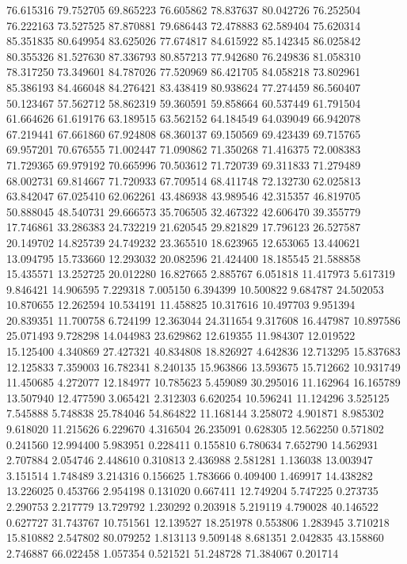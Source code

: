 76.615316
79.752705
69.865223
76.605862
78.837637
80.042726
76.252504
76.222163
73.527525
87.870881
79.686443
72.478883
62.589404
75.620314
85.351835
80.649954
83.625026
77.674817
84.615922
85.142345
86.025842
80.355326
81.527630
87.336793
80.857213
77.942680
76.249836
81.058310
78.317250
73.349601
84.787026
77.520969
86.421705
84.058218
73.802961
85.386193
84.466048
84.276421
83.438419
80.938624
77.274459
86.560407
50.123467
57.562712
58.862319
59.360591
59.858664
60.537449
61.791504
61.664626
61.619176
63.189515
63.562152
64.184549
64.039049
66.942078
67.219441
67.661860
67.924808
68.360137
69.150569
69.423439
69.715765
69.957201
70.676555
71.002447
71.090862
71.350268
71.416375
72.008383
71.729365
69.979192
70.665996
70.503612
71.720739
69.311833
71.279489
68.002731
69.814667
71.720933
67.709514
68.411748
72.132730
62.025813
63.842047
67.025410
62.062261
43.486938
43.989546
42.315357
46.819705
50.888045
48.540731
29.666573
35.706505
32.467322
42.606470
39.355779
17.746861
33.286383
24.732219
21.620545
29.821829
17.796123
26.527587
20.149702
14.825739
24.749232
23.365510
18.623965
12.653065
13.440621
13.094795
15.733660
12.293032
20.082596
21.424400
18.185545
21.588858
15.435571
13.252725
20.012280
16.827665
2.885767
6.051818
11.417973
5.617319
9.846421
14.906595
7.229318
7.005150
6.394399
10.500822
9.684787
24.502053
10.870655
12.262594
10.534191
11.458825
10.317616
10.497703
9.951394
20.839351
11.700758
6.724199
12.363044
24.311654
9.317608
16.447987
10.897586
25.071493
9.728298
14.044983
23.629862
12.619355
11.984307
12.019522
15.125400
4.340869
27.427321
40.834808
18.826927
4.642836
12.713295
15.837683
12.125833
7.359003
16.782341
8.240135
15.963866
13.593675
15.712662
10.931749
11.450685
4.272077
12.184977
10.785623
5.459089
30.295016
11.162964
16.165789
13.507940
12.477590
3.065421
2.312303
6.620254
10.596241
11.124296
3.525125
7.545888
5.748838
25.784046
54.864822
11.168144
3.258072
4.901871
8.985302
9.618020
11.215626
6.229670
4.316504
26.235091
0.628305
12.562250
0.571802
0.241560
12.994400
5.983951
0.228411
0.155810
6.780634
7.652790
14.562931
2.707884
2.054746
2.448610
0.310813
2.436988
2.581281
1.136038
13.003947
3.151514
1.748489
3.214316
0.156625
1.783666
0.409400
1.469917
14.438282
13.226025
0.453766
2.954198
0.131020
0.667411
12.749204
5.747225
0.273735
2.290753
2.217779
13.729792
1.230292
0.203918
5.219119
4.790028
40.146522
0.627727
31.743767
10.751561
12.139527
18.251978
0.553806
1.283945
3.710218
15.810882
2.547802
80.079252
1.813113
9.509148
8.681351
2.042835
43.158860
2.746887
66.022458
1.057354
0.521521
51.248728
71.384067
0.201714
